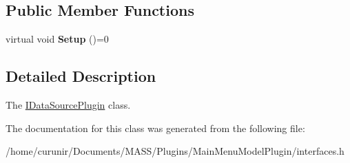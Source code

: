 \subsection*{Public Member Functions}
\begin{DoxyCompactItemize}
\item 
virtual void {\bfseries Setup} ()=0\hypertarget{class_i_data_source_plugin_afb3d43d4324e8849b1cb244c59a45987}{}\label{class_i_data_source_plugin_afb3d43d4324e8849b1cb244c59a45987}

\end{DoxyCompactItemize}


\subsection{Detailed Description}
The \hyperlink{class_i_data_source_plugin}{I\+Data\+Source\+Plugin} class. 

The documentation for this class was generated from the following file\+:\begin{DoxyCompactItemize}
\item 
/home/curunir/\+Documents/\+M\+A\+S\+S/\+Plugins/\+Main\+Menu\+Model\+Plugin/interfaces.\+h\end{DoxyCompactItemize}

